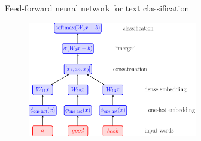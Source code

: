 \documentclass[usenames,dvipsnames,notes,11pt,aspectratio=169,hyperref={colorlinks=true, linkcolor=blue}]{beamer}
\newcommand{\pdfnote}[1]{}
\begin{document}
\begin{frame}
    {Feed-forward neural network for text classification}
    \begin{figure}
        \includegraphics[height=5cm]{figures/fflm}
    \end{figure}
    \pause
    \pdfnote{
        Word embedding can encode any feature about a single words, e.g. prefix/suffix, POS tags etc.
        The merge step allows for interaction among words in the context, e.g. bigram.
    }
\end{frame}
\end{document}
